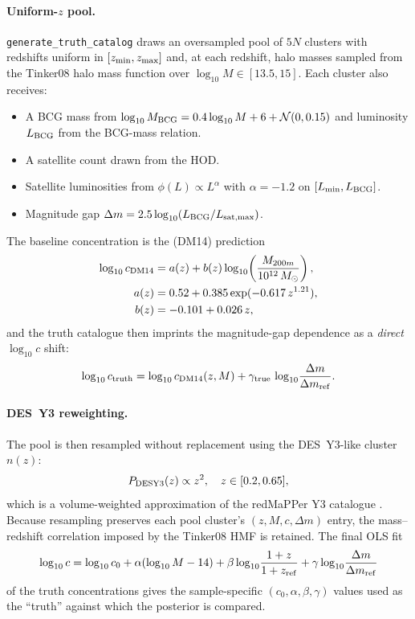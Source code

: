 \documentclass[11pt,a4paper]{article}
\newcommand{\dm}{\Delta m}
\begin{document}
\paragraph{Uniform-$z$ pool.} \texttt{generate\_truth\_catalog} draws an
oversampled pool of $5N$ clusters with redshifts uniform in $[z_{\rm min},
z_{\rm max}]$ and, at each redshift, halo masses sampled from the Tinker08
halo mass function \citep{Tinker2008} over
$\log_{10}M \in [13.5, 15]$.  Each cluster also receives:
\begin{itemize}[noitemsep]
  \item A BCG mass from
        $\log_{10}M_{\rm BCG} = 0.4\log_{10}M + 6 + \mathcal{N}(0, 0.15)$
        and luminosity $L_{\rm BCG}$ from the \citet{Zheng2007} BCG-mass
        relation.
  \item A satellite count drawn from the \citet{Zheng2007} HOD.
  \item Satellite luminosities from $\phi(L) \propto L^\alpha$ with
        $\alpha = -1.2$ on $[L_{\rm min}, L_{\rm BCG}]$.
  \item Magnitude gap $\dm = 2.5\log_{10}(L_{\rm BCG}/L_{\rm sat,max})$.
\end{itemize}
The baseline concentration is the \citet{DuttonMaccio2014} (DM14) prediction
\begin{align}
  \log_{10} c_{\rm DM14} &= a(z) + b(z)\log_{10}\!\left(\frac{M_{200m}}{10^{12}\,M_\odot}\right),
  \label{eq:DM14}\\
  a(z) &= 0.52 + 0.385\exp(-0.617\, z^{1.21}),\nonumber\\
  b(z) &= -0.101 + 0.026\,z, \nonumber
\end{align}
and the truth catalogue then imprints the magnitude-gap dependence as a
\emph{direct} $\log_{10}c$ shift:
\begin{equation}
  \log_{10} c_{\rm truth}
  = \log_{10} c_{\rm DM14}(z, M) + \gamma_{\rm true}\,\log_{10}\!\frac{\dm}{\dm_{\rm ref}}.
  \label{eq:c_truth}
\end{equation}

\paragraph{DES~Y3 reweighting.} The pool is then resampled without replacement
using the DES~Y3-like cluster $n(z)$:
\begin{equation}
  P_{\rm DESY3}(z) \propto z^2,\quad z\in[0.2, 0.65],
  \label{eq:cluster_nz}
\end{equation}
which is a volume-weighted approximation of the redMaPPer Y3 catalogue
\citep{Rykoff2016, Costanzi2021}.  Because resampling preserves each pool
cluster's $(z, M, c, \dm)$ entry, the mass--redshift correlation imposed by the
Tinker08 HMF is retained.  The final OLS fit
\begin{equation}
  \log_{10}c = \log_{10}c_0 + \alpha(\log_{10}M - 14) + \beta\log_{10}\!\frac{1+z}{1+z_{\rm ref}}
             + \gamma\log_{10}\!\frac{\dm}{\dm_{\rm ref}}
  \label{eq:parametric_c}
\end{equation}
of the truth concentrations gives the sample-specific
$(c_0, \alpha, \beta, \gamma)$ values used as the ``truth'' against which the
posterior is compared.
\end{document}
